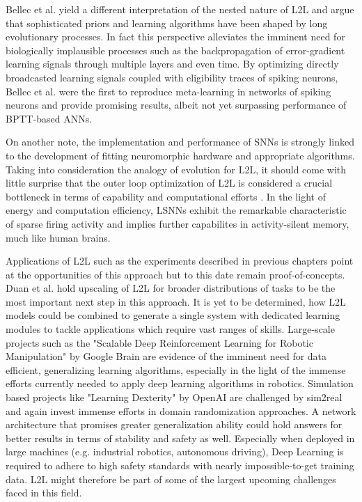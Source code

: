 \documentclass[letterpaper, 10 pt, conference]{ieeeconf}  %
\begin{document}
Bellec et al.\cite{bellecLongShorttermMemory2018} yield a different interpretation of the nested nature of L2L and argue that 
sophisticated priors and learning algorithms have been
shaped by long evolutionary processes. In fact this perspective alleviates the imminent need for biologically implausible processes such as the 
backpropagation of error-gradient learning signals through multiple layers and even time. By optimizing directly broadcasted learning signals coupled
with eligibility traces of spiking neurons, Bellec et al. were the first to reproduce meta-learning in networks of spiking neurons and provide 
promising results, albeit not yet surpassing performance of BPTT-based ANNs. \newline

On another note, the implementation and performance of SNNs is strongly linked to the development of fitting neuromorphic hardware and appropriate
algorithms. Taking into consideration the analogy of evolution for L2L, it should come with little surprise that the outer loop optimization of L2L 
is considered a crucial bottleneck in terms of capability and computational efforts \cite{duanBenchmarkingDeepReinforcement}. 
In the light of energy and computation efficiency, 
LSNNs exhibit the remarkable characteristic of sparse firing activity and implies further capabilites in activity-silent memory, much like 
human brains. \newline

Applications of L2L such as the experiments described in previous chapters point at the opportunities of this approach but to this date remain
proof-of-concepts. Duan et al.\cite{duanRLFastReinforcement2016} hold upscaling of L2L for broader distributions of tasks to be 
the most important next step in this approach. It 
is yet to be determined, how L2L models could be combined to generate a single system with dedicated learning modules to tackle applications which 
require vast ranges of skills.
Large-scale projects such as the "Scalable Deep Reinforcement 
Learning for Robotic Manipulation" by Google Brain\cite{ScalableDeepReinforcement} are evidence of the imminent need for data efficient, 
generalizing learning algorithms, 
especially in the light of the immense efforts currently needed to 
apply deep learning algorithms in robotics. Simulation based projects like "Learning Dexterity" by OpenAI \cite{LearningDexterity2018} 
are challenged by sim2real and 
again invest immense efforts in domain randomization approaches. A network architecture that promises greater generalization ability could hold 
answers for better results in terms of stability and safety as well. Especially when deployed in large machines 
(e.g. industrial robotics, autonomous driving),
Deep Learning is required to adhere to high safety standards with nearly impossible-to-get training data. 
L2L might therefore be part of some of 
the largest upcoming challenges faced in this field.
\end{document}
